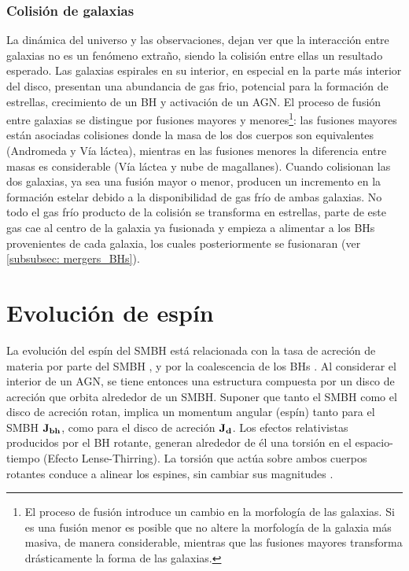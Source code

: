     \subsubsection{Colisión de galaxias}
    \label{subsubsec: mergers_galaxys}
La dinámica del universo y las observaciones, dejan ver que la interacción entre galaxias no es un fenómeno extraño, siendo la colisión entre ellas un resultado esperado. Las galaxias espirales en su interior, en especial en la parte más interior del disco, presentan una abundancia de gas frio, potencial para la formación de estrellas, crecimiento de un BH y activación de un AGN. El proceso de fusión entre galaxias se distingue por fusiones mayores y menores\footnote{El proceso de fusión introduce un cambio en la morfología de las galaxias. Si es una fusión menor es posible que no altere la morfología de la galaxia más masiva, de manera considerable, mientras que las fusiones mayores transforma drásticamente la forma de las galaxias. }: las fusiones mayores están asociadas colisiones donde la masa de los dos cuerpos son equivalentes (Andromeda y Vía láctea), mientras en las fusiones menores la diferencia entre masas es considerable (Vía láctea y nube de magallanes). Cuando colisionan las dos galaxias, ya sea una fusión mayor o menor, producen un incremento en la formación estelar debido a la disponibilidad de gas frío de ambas galaxias. No todo el gas frío producto de la colisión se transforma en estrellas, parte de este gas cae al centro de la galaxia ya fusionada y empieza a alimentar a los BHs provenientes de cada galaxia, los cuales posteriormente se fusionaran (ver \ref{subsubsec: mergers_BHs}).

\section{Evolución de espín}
\label{sec: Evolution_spin}

La evolución del espín del SMBH está  relacionada con la tasa de acreción de materia por parte del SMBH \cite{king2005}, y por la coalescencia de los BHs \cite{dubois2014}. Al considerar el interior de un AGN, se tiene entonces una estructura compuesta por un disco de acreción que orbita alrededor de un SMBH. Suponer que tanto el SMBH como el disco de acreción rotan, implica un momentum angular (espín) tanto para el SMBH $\bf{J}_{bh}$, como para el disco de acreción $\bf{J}_{d}$. 
Los efectos relativistas producidos por el BH rotante, generan alrededor de él una torsión en el espacio-tiempo (Efecto Lense-Thirring).    
La torsión que actúa sobre ambos cuerpos rotantes conduce a alinear los espines, sin cambiar sus magnitudes \cite{king2005}.

